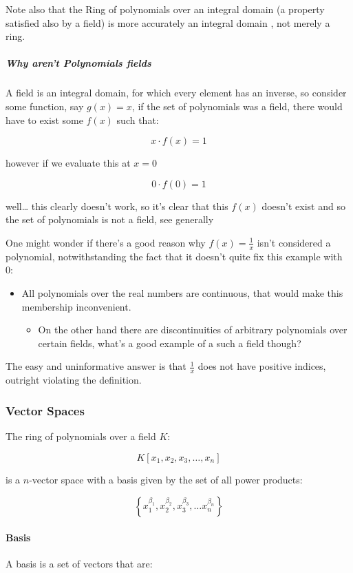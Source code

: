 \documentclass[a4paper,11pt,twoside]{article}
\begin{document}
Note also that the Ring of polynomials over an integral domain (a
property satisfied also by a field) is more accurately an
integral domain
\cite{sympydevelopmentteamBasicFunctionalityModule,RingPolynomialForms},
not merely a ring.
\subparagraph{Why aren't Polynomials fields}
\label{sec:orgb4f303f}
A field is an integral domain, for which every element has an
inverse, so consider some function, say \(g(x)=x\), if the set of polynomials
was a field, there would have to exist some \(f(x)\) such that:

\[
      x \cdot f(x) = 1
      \]

however if we evaluate this at \(x=0\)

\[
      0 \cdot f(0) = 1
      \]

well\ldots{} this clearly doesn't work, so it's clear that this \(f(x)\)
doesn't exist and so the set of polynomials is not a field, see
generally \cite{billdubuqueAbstractAlgebraWhy}

One might wonder if there's a good reason why \(f(x)=\frac{1}{x}\)
isn't considered a polynomial, notwithstanding the fact that it
doesn't quite fix this example with 0:

\begin{itemize}
\item All polynomials over the real numbers are continuous, that
would make this membership inconvenient.
\begin{itemize}
\item On the other hand there are discontinuities of arbitrary
polynomials over certain fields, what's a good example of
a such a field though?
\end{itemize}
\end{itemize}


The easy and uninformative answer is that \(\frac{1}{x}\) does
not have positive indices, outright violating the definition.

\subsubsection{Vector Spaces}
\label{sec:orgb05a40f}
The ring of polynomials over a field \(K\):

\[
    K\left[x_1, x_2, x_3, \ldots, x_n\right]
    \]

is a \(n\)-vector space with a basis given by the set of all power products:

\[
    \left\{x_1^{\beta_1}, x_2^{\beta_2}, x_3^{\beta_3}, \ldots x_n^{\beta_n} \right\}
    \]
\paragraph{Basis}
\label{sec:org0905961}
A basis is a set of vectors that
\cite[p. 39]{axlerLinearAlgebraDone2014} are:
\end{document}
